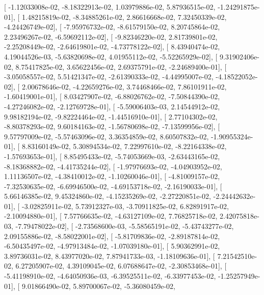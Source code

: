 \documentclass{article}
\begin{document}
       [ -1.12033008e-02,  -8.18322913e-02,   1.03979886e-02,
          5.87936515e-02,  -1.24291875e-01],
       [  1.48215819e-02,  -8.34885261e-02,   2.86616668e-02,
          7.32450339e-02,  -4.24426749e-02],
       [ -7.95976732e-02,  -8.61579150e-02,   8.20745864e-02,
          2.23496267e-02,  -6.59692112e-02],
       [ -9.82346220e-02,   2.81739801e-02,  -2.25208449e-02,
         -2.64619801e-02,  -4.73778122e-02],
       [  8.43940474e-02,   4.19044526e-03,  -5.63820698e-02,
          4.01955112e-02,  -5.52265929e-02],
       [  9.31902406e-02,   8.75417825e-02,   3.65622456e-02,
          2.69375791e-02,  -2.24689400e-01],
       [ -3.05058557e-02,   5.51421347e-02,  -2.61390333e-02,
         -4.44995007e-02,  -4.18522052e-02],
       [  2.00678646e-02,  -4.22659276e-02,   3.74468466e-02,
          7.86101911e-02,  -1.60419001e-01],
       [  8.03427907e-02,  -6.88026762e-02,  -7.50844390e-02,
         -4.27246082e-02,  -2.12769728e-01],
       [ -5.59006403e-03,   2.14544912e-02,   9.98182194e-02,
         -9.82224464e-02,  -1.44516910e-01],
       [  2.77104302e-02,  -8.80378293e-02,   9.60184163e-02,
         -1.56780698e-02,  -7.13599956e-02],
       [  9.57797009e-02,  -5.57463096e-02,   3.36354859e-02,
          8.60507832e-02,  -1.90955324e-01],
       [  8.83160149e-02,   5.30894534e-02,   7.22997610e-02,
         -8.22164338e-02,  -1.57693653e-01],
       [  8.85495433e-02,  -5.74053669e-03,  -2.63443165e-02,
         -8.18368882e-02,  -4.41735244e-02],
       [ -1.97976693e-02,  -4.04903952e-02,   1.11136507e-02,
         -4.38410012e-02,  -1.10260046e-01],
       [ -4.81009157e-02,  -7.32530635e-02,  -6.69946500e-02,
         -4.69153718e-02,  -2.16190033e-01],
       [  5.66146385e-02,   9.45324860e-02,  -4.15235269e-02,
         -2.27220851e-02,  -2.24442632e-01],
       [ -3.02825911e-02,   5.73912327e-03,  -3.70911825e-02,
          6.82891917e-02,  -2.10094880e-01],
       [  7.57766635e-02,  -4.63127109e-02,   7.76825718e-02,
          2.42075818e-03,  -7.79478022e-02],
       [ -2.73568600e-03,  -5.58565191e-02,  -5.43743277e-02,
          2.09155886e-02,  -8.58022001e-02],
       [ -5.81709836e-02,  -2.89187814e-02,  -6.50435497e-02,
         -4.97913484e-02,  -1.07039180e-01],
       [  5.90362991e-02,   3.89736031e-02,   8.43977020e-02,
          7.87941733e-03,  -1.18109636e-01],
       [  7.21542510e-02,   6.27205907e-02,   4.39109045e-02,
          6.07688647e-02,  -2.30853468e-01],
       [ -5.41198910e-02,  -4.64050936e-03,  -6.39525511e-02,
         -6.33977453e-02,  -1.25257949e-01],
       [  9.01866490e-02,   5.89700067e-02,  -5.36080459e-02,
\end{document}
